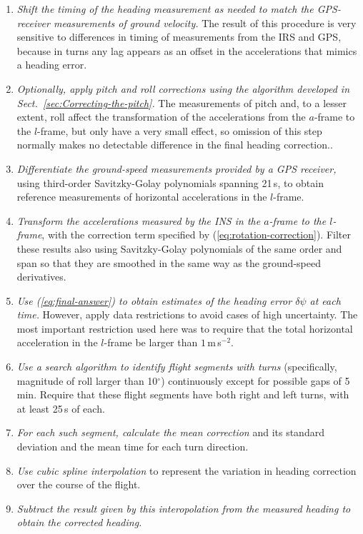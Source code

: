 \documentclass[english,british,amt,bookmarks=false,unicode=true]{copernicus}\usepackage[]{graphicx}\usepackage[]{color}
\begin{document}
\begin{enumerate}
\item \emph{Shift the timing of the heading measurement as needed to match
the GPS-receiver measurements of ground velocity. }The result of
this procedure is very sensitive to differences in timing of measurements
from the IRS and GPS, because in turns any lag appears as an offset
in the accelerations that mimics a heading error.
\item \emph{Optionally, apply pitch and roll corrections using the algorithm
developed in Sect.~\ref{sec:Correcting-the-pitch}. }The measurements
of pitch and, to a lesser extent, roll affect the transformation of
the accelerations from the $a$-frame to the $l$-frame, but only
have a very small effect, so omission of this step normally makes
no detectable difference in the final heading correction.. 
\item \emph{Differentiate the ground-speed measurements provided by a GPS
receiver,} using third-order Savitzky-Golay polynomials spanning 21\,s,
to obtain reference measurements of horizontal accelerations in the
$l$-frame. 
\item \emph{Transform the accelerations measured by the INS in the $a$-frame
to the $l$-frame}, with the correction term specified by (\ref{eq:rotation-correction}).
Filter these results also using Savitzky-Golay polynomials of the
same order and span so that they are smoothed in the same way as the
ground-speed derivatives.
\item \emph{Use (\ref{eq:final-answer}) to obtain estimates of the heading
error $\delta\psi$ at each time.} However, apply data restrictions
to avoid cases of high uncertainty. The most important restriction
used here was to require that the total horizontal acceleration in
the $l$-frame be larger than $1$\,m\,s$^{-2}$. 
\item \emph{Use a search algorithm to identify flight segments with turns}
(specifically, magnitude of roll larger than 10$^{\circ}$) continuously
except for possible gaps of 5\,min. Require that these flight segments
have both right and left turns, with at least 25\,s of each.
\item \emph{For each such segment, calculate the mean correction} and its
standard deviation and the mean time for each turn direction.
\item \emph{Use cubic spline interpolation} to represent the variation in
heading correction over the course of the flight. 
\item \emph{Subtract the result given by this interopolation from the measured
heading to obtain the corrected heading.}
\end{enumerate}
\end{document}
